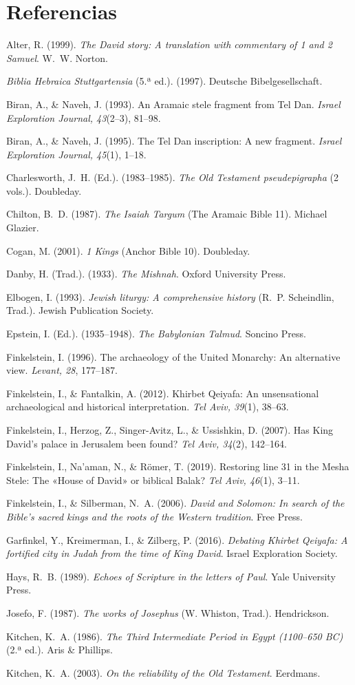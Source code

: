 \documentclass[11pt,letterpaper]{article}
\newcommand{\refapa}[1]{\par{\RaggedRight\hangindent=1.27cm\hangafter=1\noindent #1\par}\vspace{4pt}}
\begin{document}
\section*{Referencias}
\refapa{Alter, R. (1999). \emph{The David story: A translation with commentary of 1 and 2 Samuel}. W.~W. Norton.}
\refapa{\emph{Biblia Hebraica Stuttgartensia} (5.ª ed.). (1997). Deutsche Bibelgesellschaft.}
\refapa{Biran, A., \& Naveh, J. (1993). An Aramaic stele fragment from Tel Dan. \emph{Israel Exploration Journal, 43}(2--3), 81--98.}
\refapa{Biran, A., \& Naveh, J. (1995). The Tel Dan inscription: A new fragment. \emph{Israel Exploration Journal, 45}(1), 1--18.}
\refapa{Charlesworth, J.~H. (Ed.). (1983--1985). \emph{The Old Testament pseudepigrapha} (2 vols.). Doubleday.}
\refapa{Chilton, B.~D. (1987). \emph{The Isaiah Targum} (The Aramaic Bible 11). Michael Glazier.}
\refapa{Cogan, M. (2001). \emph{1 Kings} (Anchor Bible 10). Doubleday.}
\refapa{Danby, H. (Trad.). (1933). \emph{The Mishnah}. Oxford University Press.}
\refapa{Elbogen, I. (1993). \emph{Jewish liturgy: A comprehensive history} (R.~P. Scheindlin, Trad.). Jewish Publication Society.}
\refapa{Epstein, I. (Ed.). (1935--1948). \emph{The Babylonian Talmud}. Soncino Press.}
\refapa{Finkelstein, I. (1996). The archaeology of the United Monarchy: An alternative view. \emph{Levant, 28}, 177--187.}
\refapa{Finkelstein, I., \& Fantalkin, A. (2012). Khirbet Qeiyafa: An unsensational archaeological and historical interpretation. \emph{Tel Aviv, 39}(1), 38--63.}
\refapa{Finkelstein, I., Herzog, Z., Singer-Avitz, L., \& Ussishkin, D. (2007). Has King David's palace in Jerusalem been found? \emph{Tel Aviv, 34}(2), 142--164.}
\refapa{Finkelstein, I., Na'aman, N., \& Römer, T. (2019). Restoring line 31 in the Mesha Stele: The «House of David» or biblical Balak? \emph{Tel Aviv, 46}(1), 3--11.}
\refapa{Finkelstein, I., \& Silberman, N.~A. (2006). \emph{David and Solomon: In search of the Bible's sacred kings and the roots of the Western tradition}. Free Press.}
\refapa{Garfinkel, Y., Kreimerman, I., \& Zilberg, P. (2016). \emph{Debating Khirbet Qeiyafa: A fortified city in Judah from the time of King David}. Israel Exploration Society.}
\refapa{Hays, R.~B. (1989). \emph{Echoes of Scripture in the letters of Paul}. Yale University Press.}
\refapa{Josefo, F. (1987). \emph{The works of Josephus} (W. Whiston, Trad.). Hendrickson.}
\refapa{Kitchen, K.~A. (1986). \emph{The Third Intermediate Period in Egypt (1100--650 BC)} (2.ª ed.). Aris \& Phillips.}
\refapa{Kitchen, K.~A. (2003). \emph{On the reliability of the Old Testament}. Eerdmans.}
\end{document}
